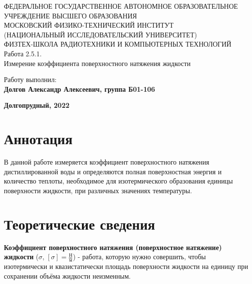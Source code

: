 \documentclass[15pt,a5paper,reqno]{article}
\begin{document}
\begin{center}
  {\small ФЕДЕРАЛЬНОЕ ГОСУДАРСТВЕННОЕ АВТОНОМНОЕ ОБРАЗОВАТЕЛЬНОЕ\\ УЧРЕЖДЕНИЕ ВЫСШЕГО ОБРАЗОВАНИЯ\\ МОСКОВСКИЙ ФИЗИКО-ТЕХНИЧЕСКИЙ ИНСТИТУТ\\ (НАЦИОНАЛЬНЫЙ ИССЛЕДОВАТЕЛЬСКИЙ УНИВЕРСИТЕТ)\\ ФИЗТЕХ-ШКОЛА РАДИОТЕХНИКИ И КОМПЬЮТЕРНЫХ ТЕХНОЛОГИЙ}\\
  \hfill \break
  \hfill \break
  \hfill \break
  \Huge{Работа 2.5.1. \\ Измерение коэффициента поверхностного натяжения жидкости}\\
\end{center}

\hfill \break
\hfill \break
\hfill \break
\hfill \break
\hfill \break
\hfill \break

\begin{flushright}
  \normalsize{Работу выполнил:}\\
  \normalsize{\textbf{Долгов Александр Алексеевич, группа Б01-106}}\\
\end{flushright}

\begin{center}
  \normalsize{\textbf{Долгопрудный, 2022}}
\end{center}

\thispagestyle{empty} %


\newpage
\thispagestyle{plain}
\tableofcontents
\thispagestyle{plain}
\newpage

\section{Аннотация}

    В данной работе измеряется коэффициент поверхностного натяжения дистиллированной воды и определяются полная поверхностная энергия и количество теплоты, необходимое для изотермического образования единицы поверхности жидкости, при различных значениях температуры.
	
\section{Теоретические сведения}

    \textbf{Коэффициент поверхностного натяжения (поверхностное натяжение) жидкости} ($\sigma$, $[\sigma] = \frac{\text{Н}}{\text{м}}$) - работа, которую нужно совершить, чтобы изотермически и квазистатически площадь поверхности жидкости на единицу при сохранении объёма жидкости неизменным.
    
\end{document}
